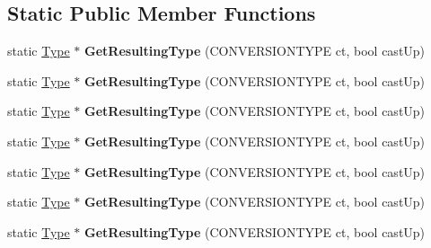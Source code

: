 \subsection*{Static Public Member Functions}
\begin{DoxyCompactItemize}
\item 
\hypertarget{classType_aadef73d6478155dd78c2dc2f840d72b6}{static \hyperlink{classType}{Type} $\ast$ {\bfseries Get\-Resulting\-Type} (C\-O\-N\-V\-E\-R\-S\-I\-O\-N\-T\-Y\-P\-E ct, bool cast\-Up)}\label{classType_aadef73d6478155dd78c2dc2f840d72b6}

\item 
\hypertarget{classType_afa5124325ffb607ae18ec77aa8793784}{static \hyperlink{classType}{Type} $\ast$ {\bfseries Get\-Resulting\-Type} (C\-O\-N\-V\-E\-R\-S\-I\-O\-N\-T\-Y\-P\-E ct, bool cast\-Up)}\label{classType_afa5124325ffb607ae18ec77aa8793784}

\item 
\hypertarget{classType_afa5124325ffb607ae18ec77aa8793784}{static \hyperlink{classType}{Type} $\ast$ {\bfseries Get\-Resulting\-Type} (C\-O\-N\-V\-E\-R\-S\-I\-O\-N\-T\-Y\-P\-E ct, bool cast\-Up)}\label{classType_afa5124325ffb607ae18ec77aa8793784}

\item 
\hypertarget{classType_afa5124325ffb607ae18ec77aa8793784}{static \hyperlink{classType}{Type} $\ast$ {\bfseries Get\-Resulting\-Type} (C\-O\-N\-V\-E\-R\-S\-I\-O\-N\-T\-Y\-P\-E ct, bool cast\-Up)}\label{classType_afa5124325ffb607ae18ec77aa8793784}

\item 
\hypertarget{classType_afa5124325ffb607ae18ec77aa8793784}{static \hyperlink{classType}{Type} $\ast$ {\bfseries Get\-Resulting\-Type} (C\-O\-N\-V\-E\-R\-S\-I\-O\-N\-T\-Y\-P\-E ct, bool cast\-Up)}\label{classType_afa5124325ffb607ae18ec77aa8793784}

\item 
\hypertarget{classType_afa5124325ffb607ae18ec77aa8793784}{static \hyperlink{classType}{Type} $\ast$ {\bfseries Get\-Resulting\-Type} (C\-O\-N\-V\-E\-R\-S\-I\-O\-N\-T\-Y\-P\-E ct, bool cast\-Up)}\label{classType_afa5124325ffb607ae18ec77aa8793784}

\item 
\hypertarget{classType_afa5124325ffb607ae18ec77aa8793784}{static \hyperlink{classType}{Type} $\ast$ {\bfseries Get\-Resulting\-Type} (C\-O\-N\-V\-E\-R\-S\-I\-O\-N\-T\-Y\-P\-E ct, bool cast\-Up)}\label{classType_afa5124325ffb607ae18ec77aa8793784}


\end{DoxyCompactItemize}
